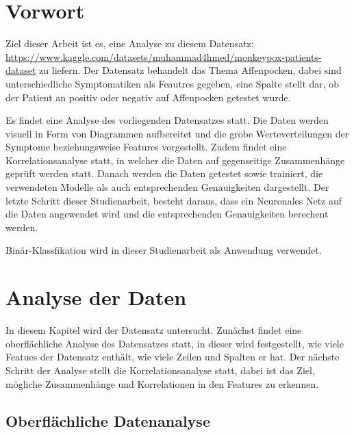 \documentclass[13pt,a4paper, listof=entryprefix, bibliography=totocnumbered,toc=listofnumbered,lof=listofnumbered]{scrartcl}
\begin{document}

	\section{Vorwort}
		\label{ch:vorwort}

	Ziel dieser Arbeit ist es, eine Analyse zu diesem Datensatz: \linebreak \url{https://www.kaggle.com/datasets/muhammad4hmed/monkeypox-patients-dataset}  
	zu liefern. Der Datensatz behandelt das Thema Affenpocken, dabei sind unterschiedliche Symptomatiken als Feautres gegeben, eine Spalte stellt dar, ob 
	der Patient an positiv oder negativ auf Affenpocken getestet wurde.

	Es findet eine Analyse des vorliegenden Datensatzes statt.  Die Daten werden visuell in Form von Diagrammen aufbereitet und die grobe Werteverteilungen
	der Symptome beziehungsweise Features vorgestellt. Zudem findet eine Korrelationsanalyse statt, in welcher die 
	Daten auf gegenseitige Zusammenhänge geprüft werden statt. Danach werden die Daten getestet sowie trainiert, die
	verwendeten Modelle als auch entsprechenden Genauigkeiten dargestellt. Der letzte Schritt dieser Studienarbeit,
	besteht daraus, dass ein Neuronales Netz auf die Daten angewendet wird und die entsprechenden Genauigkeiten
	berechent werden. 

	Binär-Klassfikation wird in dieser Studienarbeit als Anwendung verwendet. 
	

	\section{Analyse der Daten}
		\label{ch:analyse_daten}

	In diesem Kapitel wird der Datensatz untersucht. Zunächst findet eine oberflächliche Analyse des Datensatzes statt, in dieser
	wird festgestellt, wie viele Featues der Datensatz enthält, wie viele Zeilen und Spalten er hat. Der nächste Schritt der Analyse stellt die Korrelationsanalyse
	statt, dabei ist das Ziel, mögliche Zusammenhänge und Korrelationen in den Features zu erkennen. 

	\subsection{Oberflächliche Datenanalyse}
		\label{ch:oberflaechliche_analyse}
\end{document}
